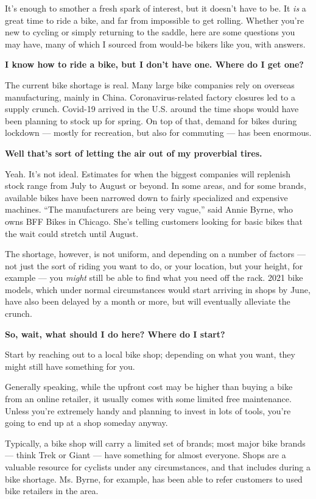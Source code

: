 It's enough to smother a fresh spark of interest, but it doesn't have to
be. It \emph{is} a great time to ride a bike, and far from impossible to
get rolling. Whether you're new to cycling or simply returning to the
saddle, here are some questions you may have, many of which I sourced
from would-be bikers like you, with answers.

\textbf{I know how to ride a bike, but I don't have one. Where do I get
one?}

The current bike shortage is real. Many large bike companies rely on
overseas manufacturing, mainly in China. Coronavirus-related factory
closures led to a supply crunch. Covid-19 arrived in the U.S. around the
time shops would have been planning to stock up for spring. On top of
that, demand for bikes during lockdown --- mostly for recreation, but
also for commuting --- has been enormous.

\textbf{Well that's sort of letting the air out of my proverbial tires.}

Yeah. It's not ideal. Estimates for when the biggest companies will
replenish stock range from July to August or beyond. In some areas, and
for some brands, available bikes have been narrowed down to fairly
specialized and expensive machines. ``The manufacturers are being very
vague,'' said Annie Byrne, who owns BFF Bikes in Chicago. She's telling
customers looking for basic bikes that the wait could stretch until
August.

The shortage, however, is not uniform, and depending on a number of
factors --- not just the sort of riding you want to do, or your
location, but your height, for example --- you \emph{might} still be
able to find what you need off the rack. 2021 bike models, which under
normal circumstances would start arriving in shops by June, have also
been delayed by a month or more, but will eventually alleviate the
crunch.

\textbf{So, wait, what should I do here? Where do I start?}

Start by reaching out to a local bike shop; depending on what you want,
they might still have something for you.

Generally speaking, while the upfront cost may be higher than buying a
bike from an online retailer, it usually comes with some limited free
maintenance. Unless you're extremely handy and planning to invest in
lots of tools, you're going to end up at a shop someday anyway.

Typically, a bike shop will carry a limited set of brands; most major
bike brands --- think Trek or Giant --- have something for almost
everyone. Shops are a valuable resource for cyclists under any
circumstances, and that includes during a bike shortage. Ms. Byrne, for
example, has been able to refer customers to used bike retailers in the
area.

